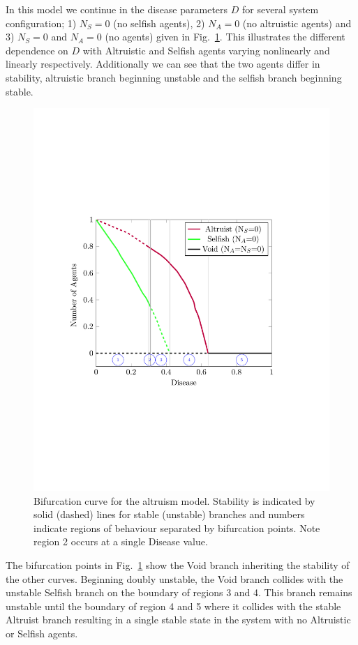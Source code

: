 \documentclass[11pt]{article}
\begin{document}
In this model we continue in the disease parameters $D$ for several system configuration; 1) $N_S=0$ (no selfish agents), 2) $N_A=0$ (no altruistic agents) and 3) $N_S=0$ and $N_A=0$ (no agents) given in Fig.~\ref{fig:altruistBifurcation}. This illustrates the different dependence on $D$ with Altruistic and Selfish agents varying nonlinearly and linearly respectively. Additionally we can see that the two agents differ in stability, altruistic branch beginning unstable and the selfish branch beginning stable. 

\begin{figure}[t]
	\centering
	\includegraphics[width=0.75\linewidth, trim=2cm 7cm 4cm 7cm, clip=true]{Altruism}	
	\caption{Bifurcation curve for the altruism model. Stability is indicated by solid (dashed) lines for stable (unstable) branches and numbers indicate regions of behaviour separated by bifurcation points. Note region 2 occurs at a single Disease value. \label{fig:altruistBifurcation}}
\end{figure}	

	The bifurcation points in Fig.~\ref{fig:altruistBifurcation} show the Void branch inheriting the stability of the other curves. Beginning doubly unstable, the Void branch collides with the unstable Selfish branch on the boundary of regions 3 and 4. This branch remains unstable until the boundary of region 4 and 5 where it collides with the stable Altruist branch resulting in a single stable state in the system with no Altruistic or Selfish agents.
	
\end{document}
